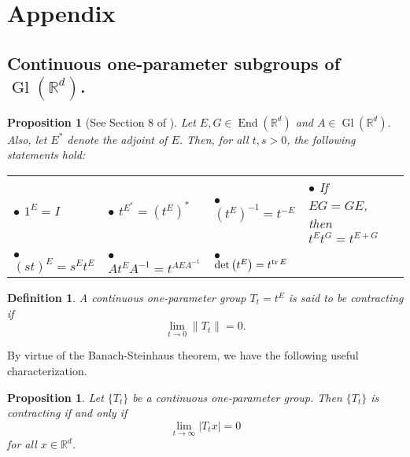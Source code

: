 \documentclass[11pt]{article}
\newtheorem{definition}[theorem]{Definition}
\newtheorem{proposition}[theorem]{Proposition}
\newcommand\End{\operatorname{End}} %
\newcommand\Gl{\operatorname{Gl}}                     %
\renewcommand\det{\operatorname{det}}
\begin{document}
\appendix



\section{Appendix}\label{sec:Appendix}
\subsection{Continuous one-parameter subgroups of $\Gl(\mathbb{R}^d)$.}\label{subsec:OneParameterGroups}

\begin{proposition}[See Section 8 of \cite{Randles2017}]\label{prop:ContinuousGroupProperties}
Let $E,G\in\End(\mathbb{R}^d)$ and $A\in\Gl(\mathbb{R}^d)$. Also, let $E^*$ denote the adjoint of $E$. Then, for all $t,s>0$, the following statements hold:

\vspace{.3cm}
\begin{tabular}{lllll}
$\bullet$ $1^E=I$ &  $\bullet$ $t^{E^*}=(t^E)^*$ & $\bullet$ $(t^E)^{-1}=t^{-E}$ &   $\bullet$ If $EG=GE$, then $t^Et^G=t^{E+G}$\\
\vspace{.1cm}\\
$\bullet$ $(st)^E=s^Et^E$ & $\bullet$ $At^EA^{-1}=t^{AEA^{-1}}$&  $\bullet$ $\det\left(t^E\right)=t^{\tr E}$\\

\end{tabular}
\end{proposition}

\begin{definition} A continuous one-parameter group $T_t=t^E$ is said to be \textit{contracting} if
\begin{equation*}
\lim_{t\to 0}\|T_t\|=0. 
\end{equation*}
\end{definition}
\noindent By virtue of the Banach-Steinhaus theorem, we have the following useful characterization.
\begin{proposition}\label{prop:ContractingCharacterization}
Let $\{T_t\}$ be a continuous one-parameter group. Then $\{T_t\}$ is contracting if and only if
\begin{equation}\label{eq:ContractingSufficient}
\lim_{t\to\infty}|T_tx|=0
\end{equation}
for all $x\in\mathbb{R}^d$.
\end{proposition}
\end{document}
